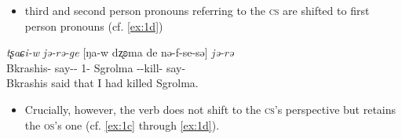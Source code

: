 \documentclass[11pt]{article}
\newcommand{\ipa}[1]{{\textit{\phon #1}}} %
\newcommand{\ipapl}[1]{{\phondroit #1}}
\begin{document}
\begin{itemize}
\item third and second person pronouns referring to the \textsc{cs} are shifted to first person pronouns (cf. \ref{ex:1d})
\end{itemize}

\begin{exe}
\ex \label{ex:1d}
\gll
	\ipa{tʂaɕi-w}	\ipa{jə-rə-ge} [\ipapl{ŋa-w} \ipapl{dʐʚma} \ipapl{de} \ipapl{nə-f-se-sə}] \ipa{jə-rə}  \\
	{Bkrashis-\erg} {say-\const-\conv} {1\sg-\erg} Sgrolma {\dem} {\prf-\inv-kill-\evid} say-\const\\ 
	\glt Bkrashis said that I had killed Sgrolma.
\end{exe}

\begin{itemize}

\item Crucially, however, the verb does not shift to the \textsc{cs}'s perspective but retains the \textsc{os}'s one (cf. \ref{ex:1c} through \ref{ex:1d}).

\end{itemize}


% 
% 
% 
% 
% 
% 
% 
\end{document}

